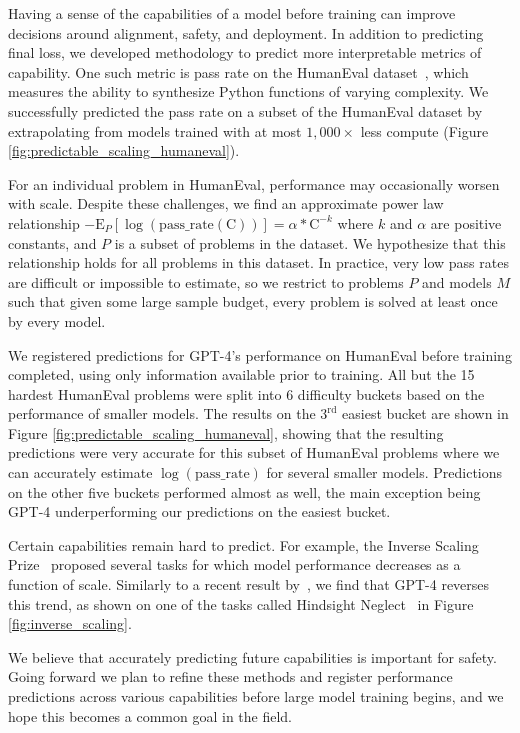 Having a sense of the capabilities of a model before training can improve decisions around alignment, safety, and deployment. In addition to predicting final loss, we developed methodology to predict more interpretable metrics of capability. One such metric is pass rate on the HumanEval dataset~\citep{chen2021codex}, which measures the ability to synthesize Python functions of varying complexity. We successfully predicted the pass rate on a subset of the HumanEval dataset by extrapolating from models trained with at most $1,000\times$ less compute (Figure \ref{fig:predictable_scaling_humaneval}).

For an individual problem in HumanEval, performance may occasionally worsen with scale. Despite these challenges, we find an approximate power law relationship $-\mathrm{E}_{P}[\log(\mathrm{pass\_rate(C)})] = \alpha*\mathrm{C}^{-k}$ where $k$ and $\alpha$ are positive constants, and $P$ is a subset of problems in the dataset.  We hypothesize that this relationship holds for all problems in this dataset.  In practice, very low pass rates are difficult or impossible to estimate, so we restrict to problems $P$ and models $M$ such that given some large sample budget, every problem is solved at least once by every model.

We registered predictions for GPT-4's performance on HumanEval before training completed, using only information available prior to training.  All but the 15 hardest HumanEval problems were split into 6 difficulty buckets based on the performance of smaller models.  The results on the $3^\mathrm{rd}$ easiest bucket are shown in Figure \ref{fig:predictable_scaling_humaneval}, showing that the resulting predictions were very accurate for this subset of HumanEval problems where we can accurately estimate $\log(\mathrm{pass\_rate})$ for several smaller models. Predictions on the other five buckets performed almost as well, the main exception being GPT-4 underperforming our predictions on the easiest bucket.

Certain capabilities remain hard to predict. For example, the Inverse Scaling Prize~\citep{mckenzie2022inverse} proposed several tasks for which model performance decreases as a function of scale. Similarly to a recent result by~\citet{wei2022inverse}, we find that GPT-4 reverses this trend, as shown on one of the tasks called Hindsight Neglect~\citep{mckenzie2022round1} in Figure \ref{fig:inverse_scaling}.

We believe that accurately predicting future capabilities is important for safety. Going forward we plan to refine these methods and register performance predictions across various capabilities before large model training begins, and we hope this becomes a common goal in the field.

